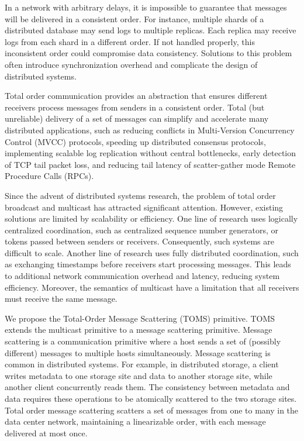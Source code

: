 In a network with arbitrary delays, it is impossible to guarantee that messages will be delivered in a consistent order. For instance, multiple shards of a distributed database may send logs to multiple replicas. Each replica may receive logs from each shard in a different order. If not handled properly, this inconsistent order could compromise data consistency. Solutions to this problem often introduce synchronization overhead and complicate the design of distributed systems.

Total order communication provides an abstraction that ensures different receivers process messages from senders in a consistent order. Total (but unreliable) delivery of a set of messages can simplify and accelerate many distributed applications, such as reducing conflicts in Multi-Version Concurrency Control (MVCC) protocols, speeding up distributed consensus protocols, implementing scalable log replication without central bottlenecks, early detection of TCP tail packet loss, and reducing tail latency of scatter-gather mode Remote Procedure Calls (RPCs).

Since the advent of distributed systems research, the problem of total order broadcast and multicast has attracted significant attention. However, existing solutions are limited by scalability or efficiency. One line of research uses logically centralized coordination, such as centralized sequence number generators, or tokens passed between senders or receivers. Consequently, such systems are difficult to scale. Another line of research uses fully distributed coordination, such as exchanging timestamps before receivers start processing messages. This leads to additional network communication overhead and latency, reducing system efficiency. Moreover, the semantics of multicast have a limitation that all receivers must receive the same message.

We propose the Total-Order Message Scattering (TOMS) primitive. TOMS extends the multicast primitive to a message scattering primitive. Message scattering is a communication primitive where a host sends a set of (possibly different) messages to multiple hosts simultaneously. Message scattering is common in distributed systems. For example, in distributed storage, a client writes metadata to one storage site and data to another storage site, while another client concurrently reads them. The consistency between metadata and data requires these operations to be atomically scattered to the two storage sites. Total order message scattering scatters a set of messages from one to many in the data center network, maintaining a linearizable order, with each message delivered at most once.

